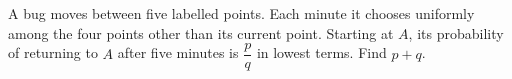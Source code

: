 A bug moves between five labelled points. Each minute it chooses uniformly among the four points other than its current point. Starting at $A$, its probability of returning to $A$ after five minutes is $\dfrac{p}{q}$ in lowest terms. Find $p+q$.
